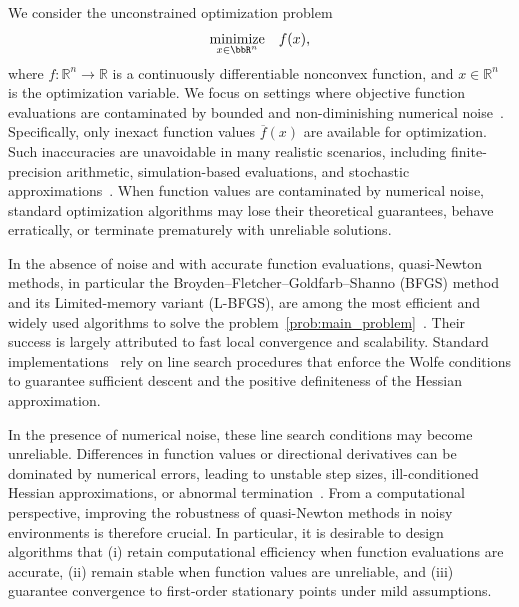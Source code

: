 \documentclass[journal]{subfiles}
\begin{document}
We consider the unconstrained optimization problem
\begin{equation}
    \underset{x \in \bbR^{n}}{\mathrm{minimize}} \quad f(x),
    \label{prob:main_problem}
\end{equation}
where $f\colon \mathbb{R}^n \to \mathbb{R}$ is a continuously differentiable nonconvex function, and $x \in \mathbb{R}^n$ is the optimization variable.
We focus on settings where objective function evaluations are contaminated by bounded and non-diminishing numerical noise~\citep{sunTrustRegionMethod2023}.
Specifically, only inexact function values $\overline{f}(x)$ are available for optimization.
Such inaccuracies are unavoidable in many realistic scenarios, including finite-precision arithmetic, simulation-based evaluations, and stochastic approximations~\citep{shiNoiseTolerantQuasiNewtonAlgorithm2022,moreEstimatingComputationalNoise2011,caflischMonteCarloQuasiMonte1998}.
When function values are contaminated by numerical noise, standard optimization algorithms may lose their theoretical guarantees, behave erratically, or terminate prematurely with unreliable solutions.

In the absence of noise and with accurate function evaluations, quasi-Newton methods, in particular the Broyden--Fletcher--Goldfarb--Shanno (BFGS) method and its Limited-memory variant (L-BFGS), are among the most efficient and widely used algorithms to solve the problem~\eqref{prob:main_problem}~\citep{liuLimitedMemoryBFGS1989a,nocedal1999numerical}.
Their success is largely attributed to fast local convergence and scalability.
Standard implementations~\citep{2020SciPy-NMeth,Okazaki2007libLBFGS} rely on line search procedures that enforce the Wolfe conditions to guarantee sufficient descent and the positive definiteness of the Hessian approximation.

In the presence of numerical noise, these line search conditions may become unreliable.
Differences in function values or directional derivatives can be dominated by numerical errors, leading to unstable step sizes, ill-conditioned Hessian approximations, or abnormal termination~\citep{shiNoiseTolerantQuasiNewtonAlgorithm2022,paquetteStochasticLineSearch2020}.
From a computational perspective, improving the robustness of quasi-Newton methods in noisy environments is therefore crucial.
In particular, it is desirable to design algorithms that (i) retain computational efficiency when function evaluations are accurate, (ii) remain stable when function values are unreliable, and (iii) guarantee convergence to first-order stationary points under mild assumptions.
\end{document}
